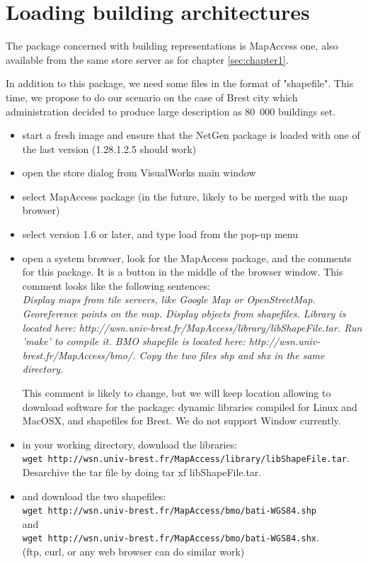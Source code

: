 \section{Loading building architectures}

The package concerned with building representations is MapAccess one, also available from 
the same store server as for chapter \ref{sec:chapter1}. 

In addition to this package, we need some files in the format of "shapefile". This time, 
we propose to do our scenario on the case of Brest city which administration decided 
to produce large description as 80~000 buildings set. 

\begin{itemize}
\item start a fresh image and ensure that the NetGen package is loaded with one of the last
version (1.28.1.2.5 should work)
\item open the store dialog from VisualWorks main window
\item select MapAccess package (in the future, likely to be merged with the map browser)
\item select version 1.6 or later, and type load from the pop-up menu
\item open a system browser, look for the MapAccess package, and the comments 
for this package. It is a button in the middle of the browser window. 
This comment looks like the following sentences:
\\
\emph{Display maps from tile servers, like Google Map or OpenStreetMap.
Georeference points on the map.
Display objects from shapefiles. 
Library is located here: http://wsn.univ-brest.fr/MapAccess/library/libShapeFile.tar. Run 'make' to compile it. 
BMO shapefile is located here: http://wsn.univ-brest.fr/MapAccess/bmo/. Copy the two files shp and shx in the same directory. 
}

This comment is likely to change, but we will keep location allowing to download 
software for the package: dynamic libraries compiled for Linux and MacOSX, and 
shapefiles for Brest. We do not support Window currently. 

\item in your working directory, download the libraries: \\
\verb!wget http://wsn.univ-brest.fr/MapAccess/library/libShapeFile.tar!. 
\\
Desarchive the tar file by doing tar xf libShapeFile.tar. 
\item and download the two shapefiles: 
\\
\verb!wget http://wsn.univ-brest.fr/MapAccess/bmo/bati-WGS84.shp! 
\\ and \\ 
\verb!wget http://wsn.univ-brest.fr/MapAccess/bmo/bati-WGS84.shx!. 
\\
(ftp, curl, or any web browser can do similar work)
\end{itemize}

